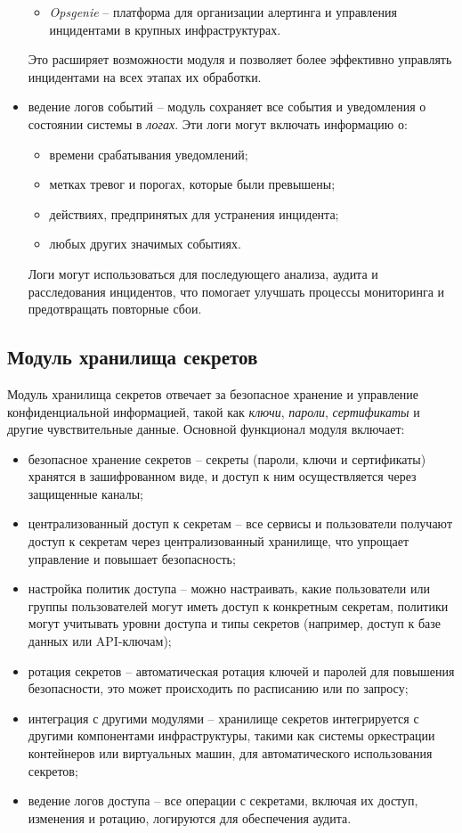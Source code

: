 \begin{itemize}
\begin{itemize}
        \item \textit{Opsgenie} -- платформа для организации алертинга и управления инцидентами в крупных инфраструктурах.
    \end{itemize}
    Это расширяет возможности модуля и позволяет более эффективно управлять инцидентами на всех этапах их обработки.
    \item ведение логов событий -- модуль сохраняет все события и уведомления о состоянии системы в \textit{логах}. Эти логи могут включать информацию о:
    \begin{itemize}
        \item времени срабатывания уведомлений;
        \item метках тревог и порогах, которые были превышены;
        \item действиях, предпринятых для устранения инцидента;
        \item любых других значимых событиях.
    \end{itemize}
    Логи могут использоваться для последующего анализа, аудита и расследования инцидентов, что помогает улучшать процессы мониторинга и предотвращать повторные сбои.
\end{itemize}

\subsection{Модуль хранилища секретов}
\label{sec:secrets_storage_functionality}

Модуль хранилища секретов отвечает за безопасное хранение и управление конфиденциальной информацией, такой как \textit{ключи}, \textit{пароли}, \textit{сертификаты} и другие чувствительные данные. Основной функционал модуля включает:

\begin{itemize}
    \item безопасное хранение секретов -- секреты (пароли, ключи и сертификаты) хранятся в зашифрованном виде, и доступ к ним осуществляется через защищенные каналы; 
    \item централизованный доступ к секретам -- все сервисы и пользователи получают доступ к секретам через централизованный хранилище, что упрощает управление и повышает безопасность; 
    \item настройка политик доступа -- можно настраивать, какие пользователи или группы пользователей могут иметь доступ к конкретным секретам, политики могут учитывать уровни доступа и типы секретов (например, доступ к базе данных или API-ключам); 
    \item ротация секретов -- автоматическая ротация ключей и паролей для повышения безопасности, это может происходить по расписанию или по запросу; 
    \item интеграция с другими модулями -- хранилище секретов интегрируется с другими компонентами инфраструктуры, такими как системы оркестрации контейнеров или виртуальных машин, для автоматического использования секретов; 
    \item ведение логов доступа -- все операции с секретами, включая их доступ, изменения и ротацию, логируются для обеспечения аудита. 
\end{itemize}

